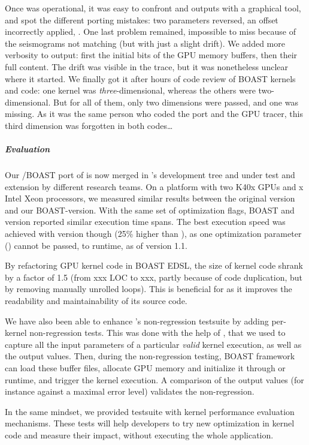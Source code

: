 Once  was operational, it was easy to confront \Cuda
and \OCL outputs with a graphical  tool, and spot the
different porting mistakes: two parameters reversed, an offset
incorrectly applied, \etc{}. One last problem remained, impossible to
miss because of the seismograms not matching (but with just a slight
drift). We added more verbosity to  output: first the
initial bits of the GPU memory buffers, then their full content. The
drift was visible in the trace, but it was nonetheless unclear where
it started. We finally got it after hours of code review of BOAST
kernels and \OCL code: one kernel was \emph{three}-dimensional,
whereas the others were two-dimensional. But for all of them, only two
dimensions were passed, and one was missing. As it was the same person
who coded the \OCL port and the GPU tracer, this third dimension was
forgotten in both codes\ldots

\subparagraph{Evaluation} Our \OCL/BOAST port of \Specfem is now
merged in \Specfem's development tree and under test and extension by
different research teams. On a platform with two K40x GPUs and x Intel
Xeon processors, we measured similar results between the original
\Cuda version and our BOAST-\Cuda version. With the same set of
optimization flags, BOAST \Cuda and \OCL version reported similar
execution time spans. The best execution speed was achieved with \Cuda
version though (25\% higher than \OCL), as one optimization parameter
() cannot be passed, to \OCL runtime, as of
version 1.1.

By refactoring GPU kernel code in BOAST EDSL, the size of kernel code
shrank by a factor of 1.5 (from xxx LOC to xxx, partly because of code
duplication, but by removing manually unrolled loops). This is
beneficial for \Specfem as it improves the readability and
maintainability of its source code.

We have also been able to enhance \Specfem's non-regression testsuite
by adding per-kernel non-regression tests. This was done with the help
of , that we used to capture all the input parameters
of a particular \emph{valid} kernel execution, as well as the output
values. Then, during the non-regression testing, BOAST framework can
load these buffer files, allocate GPU memory and initialize it through
\Cuda or \OCL runtime, and trigger the kernel execution. A comparison
of the output values (for instance against a maximal error level)
validates the non-regression.

In the same mindset, we provided \Specfem testsuite with kernel
performance evaluation mechanisms. These tests will help developers to
try new optimization in kernel code and measure their impact, without
executing the whole application.

